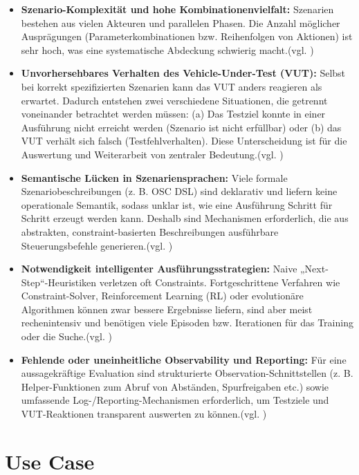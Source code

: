 \begin{itemize}
    \item \textbf{Szenario-Komplexität und hohe Kombinationenvielfalt:} Szenarien bestehen aus vielen Akteuren und parallelen Phasen. Die Anzahl möglicher Ausprägungen (Parameterkombinationen bzw. Reihenfolgen von Aktionen) ist sehr hoch, was eine systematische Abdeckung schwierig macht.(vgl. \cite{EinfuehrungIntegrationsprojekt})
    \item \textbf{Unvorhersehbares Verhalten des Vehicle-Under-Test (VUT):} Selbst bei korrekt spezifizierten Szenarien kann das VUT anders reagieren als erwartet. Dadurch entstehen zwei verschiedene Situationen, die getrennt voneinander betrachtet werden müssen: (a) Das Testziel konnte in einer Ausführung nicht erreicht werden (Szenario ist nicht erfüllbar) oder (b) das VUT verhält sich falsch (Testfehlverhalten). Diese Unterscheidung ist für die Auswertung und Weiterarbeit von zentraler Bedeutung.(vgl. \cite{EinfuehrungIntegrationsprojekt})
    \item \textbf{Semantische Lücken in Szenariensprachen:} Viele formale Szenariobeschreibungen (z. B. OSC DSL) sind deklarativ und liefern keine operationale Semantik, sodass unklar ist, wie eine Ausführung Schritt für Schritt erzeugt werden kann. Deshalb sind Mechanismen erforderlich, die aus abstrakten, constraint-basierten Beschreibungen ausführbare Steuerungsbefehle generieren.(vgl. \cite{EinfuehrungIntegrationsprojekt})
    \item \textbf{Notwendigkeit intelligenter Ausführungsstrategien:} Naive „Next-Step“-Heuristiken verletzen oft Constraints. Fortgeschrittene Verfahren wie Constraint-Solver, Reinforcement Learning (RL) oder evolutionäre Algorithmen können zwar bessere Ergebnisse liefern, sind aber meist rechenintensiv und benötigen viele Episoden bzw. Iterationen für das Training oder die Suche.(vgl. \cite{EinfuehrungIntegrationsprojekt})
    \item \textbf{Fehlende oder uneinheitliche Observability und Reporting:} Für eine aussagekräftige Evaluation sind strukturierte Observation-Schnittstellen (z. B. Helper-Funktionen zum Abruf von Abständen, Spurfreigaben etc.) sowie umfassende Log-/Reporting-Mechanismen erforderlich, um Testziele und VUT-Reaktionen transparent auswerten zu können.(vgl. \cite{EinfuehrungIntegrationsprojekt})
\end{itemize}

\section{Use Case}

